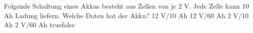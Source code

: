     {Folgende Schaltung eines Akkus besteht aus Zellen von je 2 V. Jede Zelle kann 10 Ah Ladung liefern. Welche Daten hat der Akku?}
    {12 V/10 Ah}
    {12 V/60 Ah}
    {2 V/10 Ah}
    {2 V/60 Ah}
    {true}{false}